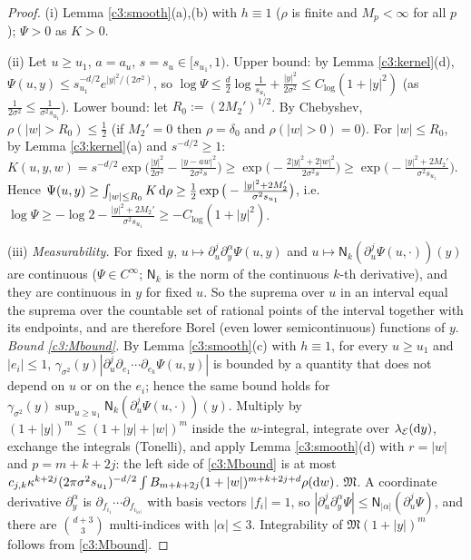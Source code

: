 \begin{proof}
(i) Lemma \ref{c3:smooth}(a),(b) with $h\equiv1$ ($\rho$ is finite and $M_p<\infty$ for all $p$); $\Psi>0$ as $K>0$.

(ii) Let $u\ge u_1$, $a=a_u$, $s=s_u\in[s_{u_1},1)$. Upper bound: by Lemma \ref{c3:kernel}(d), $\Psi(u,y)\le s_{u_1}^{-d/2}e^{|y|^2/(2\sigma^2)}$, so $\log\Psi\le\frac d2\log\frac1{s_{u_1}}+\frac{|y|^2}{2\sigma^2}\le C_{\log}(1+|y|^2)$ (as $\frac1{2\sigma^2}\le\frac1{\sigma^2s_{u_1}}$).
Lower bound: let $R_0:=(2M_2')^{1/2}$. By Chebyshev, $\rho(|w|>R_0)\le\frac12$ (if $M_2'=0$ then $\rho=\delta_0$ and $\rho(|w|>0)=0$). For $|w|\le R_0$, by Lemma \ref{c3:kernel}(a) and $s^{-d/2}\ge1$:
$K(u,y,w)=s^{-d/2}\exp\big(\frac{|y|^2}{2\sigma^2}-\frac{|y-aw|^2}{2\sigma^2s}\big)\ge\exp\big(-\frac{2|y|^2+2|w|^2}{2\sigma^2s}\big)\ge\exp\big(-\frac{|y|^2+2M_2'}{\sigma^2s_{u_1}}\big)$.
Hence $\Psi(u,y)\ge\int_{|w|\le R_0}K\,\mathrm{d}\rho\ge\frac12\exp\big(-\frac{|y|^2+2M_2'}{\sigma^2s_{u_1}}\big)$, i.e.\ $\log\Psi\ge-\log2-\frac{|y|^2+2M_2'}{\sigma^2s_{u_1}}\ge-C_{\log}(1+|y|^2)$.

(iii) \emph{Measurability.} For fixed $y$, $u\mapsto\partial_u^j\partial^\alpha_y\Psi(u,y)$ and $u\mapsto\mathsf N_k(\partial_u^j\Psi(u,\cdot))(y)$ are continuous ($\Psi\in C^\infty$; $\mathsf N_k$ is the norm of the continuous $k$-th derivative), and they are continuous in $y$ for fixed $u$. So the suprema over $u$ in an interval equal the suprema over the countable set of rational points of the interval together with its endpoints, and are therefore Borel (even lower semicontinuous) functions of $y$.
\emph{Bound \eqref{c3:Mbound}.} By Lemma \ref{c3:smooth}(c) with $h\equiv1$, for every $u\ge u_1$ and $|e_i|\le1$, $\gamma_{\sigma^2}(y)|\partial_u^j\partial_{e_1}\cdots\partial_{e_k}\Psi(u,y)|$ is bounded by a quantity that does not depend on $u$ or on the $e_i$; hence the same bound holds for $\gamma_{\sigma^2}(y)\sup_{u\ge u_1}\mathsf N_k(\partial_u^j\Psi(u,\cdot))(y)$. Multiply by $(1+|y|)^m\le(1+|y|+|w|)^m$ inside the $w$-integral, integrate over $\lambda_{\mathcal E}(\mathrm{d} y)$, exchange the integrals (Tonelli), and apply Lemma \ref{c3:smooth}(d) with $r=|w|$ and $p=m+k+2j$:
the left side of \eqref{c3:Mbound} is at most $c_{j,k}\kappa^{k+2j}(2\pi\sigma^2s_{u_1})^{-d/2}\int B_{m+k+2j}(1+|w|)^{m+k+2j+d}\rho(\mathrm{d} w)$.
\emph{$\mathfrak M$.} A coordinate derivative $\partial_y^\alpha$ is $\partial_{f_{i_1}}\cdots\partial_{f_{i_{|\alpha|}}}$ with basis vectors $|f_i|=1$, so $|\partial_u^j\partial_y^\alpha\Psi|\le\mathsf N_{|\alpha|}(\partial_u^j\Psi)$, and there are $\binom{d+3}3$ multi-indices with $|\alpha|\le3$. Integrability of $\mathfrak M(1+|y|)^m$ follows from \eqref{c3:Mbound}.


\end{proof}
